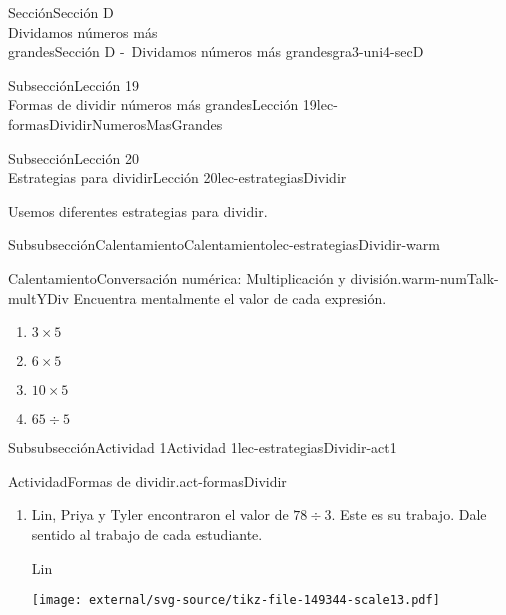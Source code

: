 \begin{sectionptx}{Sección}{{\Large Sección D\\}Dividamos números más\\grandes}{}{Sección D -~Dividamos números más grandes}{}{}{gra3-uni4-secD}
\begin{subsectionptx}{Subsección}{{\normalsize Lección 19\\[-0.05cm]}Formas de dividir números más grandes}{}{Lección 19}{}{}{lec-formasDividirNumerosMasGrandes}
\end{subsectionptx}
%
%
\typeout{************************************************}
\typeout{************************************************}
%
\clearpage
\begin{subsectionptx}{Subsección}{{\normalsize Lección 20\\[-0.05cm]}Estrategias para dividir}{}{Lección 20}{}{}{lec-estrategiasDividir}
\begin{introduction}{}%
Usemos diferentes estrategias para dividir.%
\end{introduction}%
%
%
\typeout{************************************************}
\typeout{************************************************}
%
\begin{subsubsectionptx}{Subsubsección}{Calentamiento}{}{Calentamiento}{}{}{lec-estrategiasDividir-warm}
\begin{exploration}{Calentamiento}{Conversación numérica: Multiplicación y división.}{warm-numTalk-multYDiv}%
Encuentra mentalmente el valor de cada expresión.%
%
\begin{enumerate}[label={\Alph*.}]
\item{}\(\displaystyle 3\times 5\)%
\item{}\(\displaystyle 6\times 5\)%
\item{}\(\displaystyle 10\times 5\)%
\item{}\(\displaystyle 65\div 5\)%
\end{enumerate}
\end{exploration}%
\end{subsubsectionptx}
%
%
\typeout{************************************************}
\typeout{************************************************}
%
\begin{subsubsectionptx}{Subsubsección}{Actividad 1}{}{Actividad 1}{}{}{lec-estrategiasDividir-act1}
\begin{activity}{Actividad}{Formas de dividir.}{act-formasDividir}%
%
\begin{enumerate}
\item{}Lin, Priya y Tyler encontraron el valor de \(78 \div 3\). Este es su trabajo. Dale sentido al trabajo de cada estudiante.%
\par
Lin%
\par
\begin{image}{0}{1}{0}{}%
\texttt{[image: external/svg-source/tikz-file-149344-scale13.pdf]}

\end{image}
\end{enumerate}
\end{activity}
\end{subsubsectionptx}
\end{subsectionptx}
\end{sectionptx}
